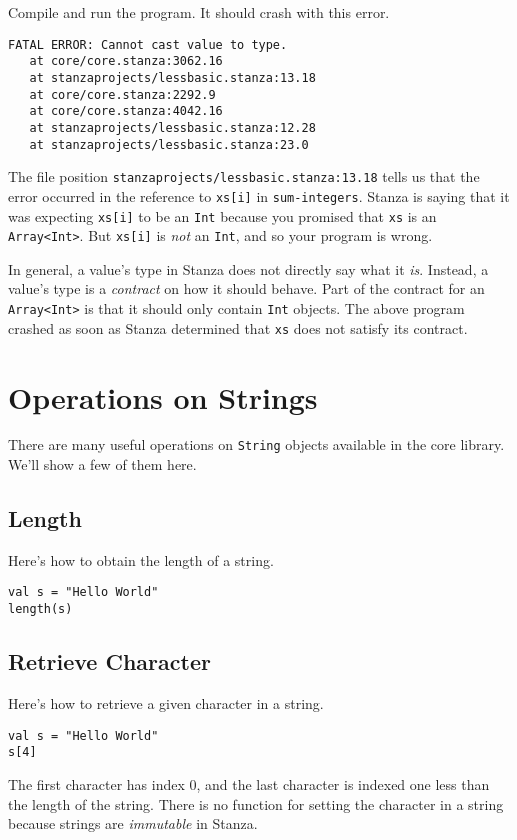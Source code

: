 \documentclass[10pt,oneside]{book}
\begin{document}
Compile and run the program. It should crash with this error.
\begin{lstlisting}
FATAL ERROR: Cannot cast value to type.
   at core/core.stanza:3062.16
   at stanzaprojects/lessbasic.stanza:13.18
   at core/core.stanza:2292.9
   at core/core.stanza:4042.16
   at stanzaprojects/lessbasic.stanza:12.28
   at stanzaprojects/lessbasic.stanza:23.0
\end{lstlisting}
The file position \texttt{\frenchspacing stanzaprojects/lessbasic.stanza:13.18} tells us that the error occurred in the reference to \texttt{\frenchspacing xs[i]} in \texttt{\frenchspacing sum-integers}. Stanza is saying that it was expecting \texttt{\frenchspacing xs[i]} to be an \texttt{\frenchspacing Int} because you promised that \texttt{\frenchspacing xs} is an \texttt{\frenchspacing Array<Int>}. But \texttt{\frenchspacing xs[i]} is {\em not} an \texttt{\frenchspacing Int}, and so your program is wrong.

In general, a value's type in Stanza does not directly say what it {\em is}. Instead, a value's type is a {\em contract} on how it should behave. Part of the contract for an \texttt{\frenchspacing Array<Int>} is that it should only contain \texttt{\frenchspacing Int} objects. The above program crashed as soon as Stanza determined that \texttt{\frenchspacing xs} does not satisfy its contract. 

\section{Operations on Strings}
There are many useful operations on \texttt{\frenchspacing String} objects available in the core library. We'll show a few of them here.

\subsection*{Length}
Here's how to obtain the length of a string.
\begin{lstlisting}
val s = "Hello World"
length(s)
\end{lstlisting}

\subsection*{Retrieve Character}
Here's how to retrieve a given character in a string.
\begin{lstlisting}
val s = "Hello World"
s[4]
\end{lstlisting}
The first character has index 0, and the last character is indexed one less than the length of the string. There is no function for setting the character in a string because strings are {\em immutable} in Stanza. 
\end{document}
